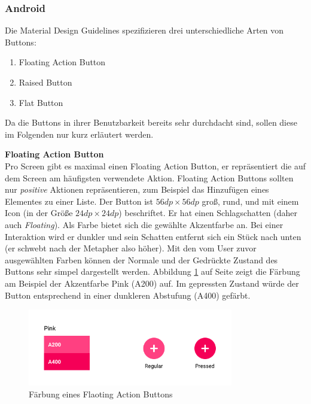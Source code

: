 \subsubsection{Android}

Die Material Design Guidelines spezifizieren drei unterschiedliche Arten von Buttons:

\begin{enumerate}
	\item Floating Action Button
	\item Raised Button
	\item Flat Button
\end{enumerate}

Da die Buttons in ihrer Benutzbarkeit bereits sehr durchdacht sind, sollen diese im Folgenden nur kurz erläutert werden.

\textbf{Floating Action Button} \\
Pro Screen gibt es maximal einen Floating Action Button, er repräsentiert die auf dem Screen am häufigsten verwendete Aktion. Floating Action Buttons sollten nur \textit{positive} Aktionen repräsentieren, zum Beispiel das Hinzufügen eines Elementes zu einer Liste.
Der Button ist $56dp \times 56dp$ groß, rund, und mit einem Icon (in der Größe $24dp \times 24dp$) beschriftet. Er hat einen Schlagschatten (daher auch \textit{Floating}). Als Farbe bietet sich die gewählte Akzentfarbe an. Bei einer Interaktion wird er dunkler und sein Schatten entfernt sich ein Stück nach unten (er schwebt nach der Metapher also höher).
Mit den vom User zuvor ausgewählten Farben können der Normale und der Gedrückte Zustand des Buttons sehr simpel dargestellt werden. Abbildung \ref{fig:fab-colors} auf Seite \pageref{fig:fab-colors} zeigt die Färbung am Beispiel der Akzentfarbe Pink (A200) auf. Im gepressten Zustand würde der Button entsprechend in einer dunkleren Abstufung (A400) gefärbt.

\begin{figure}[h]
    \centering
    \includegraphics[width=0.8\textwidth]{images/FAB-colors.png}
    \caption{Färbung eines Flaoting Action Buttons}
    \label{fig:fab-colors}
\end{figure}

